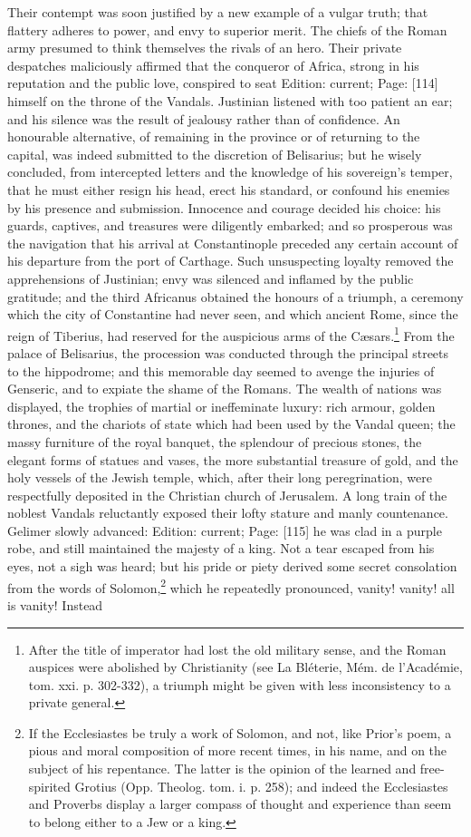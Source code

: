 Their contempt was soon justified by a new example of a vulgar truth; that flattery adheres to power, and envy to superior merit. The chiefs of the Roman army presumed to think themselves the rivals of an hero. Their private despatches maliciously affirmed that the conqueror of Africa, strong in his reputation and the public love, conspired to seat Edition: current; Page: [114] himself on the throne of the Vandals. Justinian listened with too patient an ear; and his silence was the result of jealousy rather than of confidence. An honourable alternative, of remaining in the province or of returning to the capital, was indeed submitted to the discretion of Belisarius; but he wisely concluded, from intercepted letters and the knowledge of his sovereign\texthebrew{}’s temper, that he must either resign his head, erect his standard, or confound his enemies by his presence and submission. Innocence and courage decided his choice: his guards, captives, and treasures were diligently embarked; and so prosperous was the navigation that his arrival at Constantinople preceded any certain account of his departure from the port of Carthage. Such unsuspecting loyalty removed the apprehensions of Justinian; envy was silenced and inflamed by the public gratitude; and the third Africanus obtained the honours of a triumph, a ceremony which the city of Constantine had never seen, and which ancient Rome, since the reign of Tiberius, had reserved for the auspicious arms of the Cæsars.\footnote{After the title of imperator had lost the old military sense, and the Roman auspices were abolished by Christianity (see La Bléterie, Mém. de l\texthebrew{}’Académie, tom. xxi. p. 302-332), a triumph might be given with less inconsistency to a private general.} From the palace of Belisarius, the procession was conducted through the principal streets to the hippodrome; and this memorable day seemed to avenge the injuries of Genseric, and to expiate the shame of the Romans. The wealth of nations was displayed, the trophies of martial or ineffeminate luxury: rich armour, golden thrones, and the chariots of state which had been used by the Vandal queen; the massy furniture of the royal banquet, the splendour of precious stones, the elegant forms of statues and vases, the more substantial treasure of gold, and the holy vessels of the Jewish temple, which, after their long peregrination, were respectfully deposited in the Christian church of Jerusalem. A long train of the noblest Vandals reluctantly exposed their lofty stature and manly countenance. Gelimer slowly advanced: Edition: current; Page: [115] he was clad in a purple robe, and still maintained the majesty of a king. Not a tear escaped from his eyes, not a sigh was heard; but his pride or piety derived some secret consolation from the words of Solomon,\footnote{If the Ecclesiastes be truly a work of Solomon, and not, like Prior\texthebrew{}’s poem, a pious and moral composition of more recent times, in his name, and on the subject of his repentance. The latter is the opinion of the learned and free-spirited Grotius (Opp. Theolog. tom. i. p. 258); and indeed the Ecclesiastes and Proverbs display a larger compass of thought and experience than seem to belong either to a Jew or a king.} which he repeatedly pronounced, vanity! vanity! all is vanity! Instead 